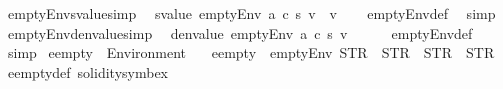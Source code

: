 \begin{isabellebody}
\isamarkupfalse%
\ emptyEnv{\isacharunderscore}{\kern0pt}svalue{\isacharbrackleft}{\kern0pt}simp{\isacharbrackright}{\kern0pt}{\isacharcolon}{\kern0pt}\isanewline
\ \ {\isachardoublequoteopen}svalue\ {\isacharparenleft}{\kern0pt}emptyEnv\ a\ c\ s\ v{\isacharparenright}{\kern0pt}\ {\isacharequal}{\kern0pt}\ v{\isachardoublequoteclose}\isanewline
%
\isadelimproof
\ \ %
\endisadelimproof
%
\isatagproof
{}\isamarkupfalse%
\ emptyEnv{\isacharunderscore}{\kern0pt}def\ \isamarkupfalse%
\ simp%
\endisatagproof
{\isafoldproof}%
%
\isadelimproof
\isanewline
%
\endisadelimproof
\isanewline
{}\isamarkupfalse%
\ emptyEnv{\isacharunderscore}{\kern0pt}denvalue{\isacharbrackleft}{\kern0pt}simp{\isacharbrackright}{\kern0pt}{\isacharcolon}{\kern0pt}\isanewline
\ \ {\isachardoublequoteopen}denvalue\ {\isacharparenleft}{\kern0pt}emptyEnv\ a\ c\ s\ v{\isacharparenright}{\kern0pt}\ {\isacharequal}{\kern0pt}\ {\isacharbraceleft}{\kern0pt}{\isachardollar}{\kern0pt}{\isachardollar}{\kern0pt}{\isacharbraceright}{\kern0pt}{\isachardoublequoteclose}\isanewline
%
\isadelimproof
\ \ %
\endisadelimproof
%
\isatagproof
{}\isamarkupfalse%
\ emptyEnv{\isacharunderscore}{\kern0pt}def\ \isamarkupfalse%
\ simp%
\endisatagproof
{\isafoldproof}%
%
\isadelimproof
\isanewline
%
\endisadelimproof
\isanewline
{}\isamarkupfalse%
\ eempty\ {\isacharcolon}{\kern0pt}{\isacharcolon}{\kern0pt}\ {\isachardoublequoteopen}Environment{\isachardoublequoteclose}\isanewline
\ \ \ {\isachardoublequoteopen}eempty\ {\isacharequal}{\kern0pt}\ emptyEnv\ {\isacharparenleft}{\kern0pt}STR\ {\isacharprime}{\kern0pt}{\isacharprime}{\kern0pt}{\isacharprime}{\kern0pt}{\isacharprime}{\kern0pt}{\isacharparenright}{\kern0pt}\ {\isacharparenleft}{\kern0pt}STR\ {\isacharprime}{\kern0pt}{\isacharprime}{\kern0pt}{\isacharprime}{\kern0pt}{\isacharprime}{\kern0pt}{\isacharparenright}{\kern0pt}\ {\isacharparenleft}{\kern0pt}STR\ {\isacharprime}{\kern0pt}{\isacharprime}{\kern0pt}{\isacharprime}{\kern0pt}{\isacharprime}{\kern0pt}{\isacharparenright}{\kern0pt}\ {\isacharparenleft}{\kern0pt}STR\ {\isacharprime}{\kern0pt}{\isacharprime}{\kern0pt}{\isacharprime}{\kern0pt}{\isacharprime}{\kern0pt}{\isacharparenright}{\kern0pt}{\isachardoublequoteclose}\isanewline
\isanewline
{}\isamarkupfalse%
\ eempty{\isacharunderscore}{\kern0pt}def\ {\isacharbrackleft}{\kern0pt}solidity{\isacharunderscore}{\kern0pt}symbex{\isacharbrackright}{\kern0pt}\isanewline
\isanewline
{}\isamarkupfalse%

\end{isabellebody}
